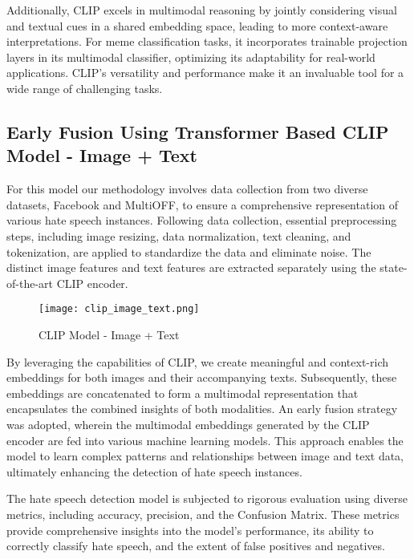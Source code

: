 \documentclass{ieeeaccess}
\begin{document}
Additionally, CLIP excels in multimodal reasoning by jointly considering visual and textual cues in a shared embedding space, leading to more context-aware interpretations. For meme classification tasks, it incorporates trainable projection layers in its multimodal classifier, optimizing its adaptability for real-world applications. CLIP's versatility and performance make it an invaluable tool for a wide range of challenging tasks.

\subsection{Early Fusion Using Transformer Based CLIP Model - Image + Text}

For this model our methodology involves data collection from two diverse datasets, Facebook and MultiOFF, to ensure a comprehensive representation of various hate speech instances. Following data collection, essential preprocessing steps, including image resizing, data normalization, text cleaning, and tokenization, are applied to standardize the data and eliminate noise. The distinct image features and text features are extracted separately using the state-of-the-art CLIP encoder.

\begin{figure}[htbp]
\centering
\texttt{[image: clip\_image\_text.png]}
\caption{CLIP Model - Image + Text}
\label{fig:clip_image_text}
\end{figure}

By leveraging the capabilities of CLIP, we create meaningful and context-rich embeddings for both images and their accompanying texts. Subsequently, these embeddings are concatenated to form a multimodal representation that encapsulates the combined insights of both modalities. An early fusion strategy was adopted, wherein the multimodal embeddings generated by the CLIP encoder are fed into various machine learning models. This approach enables the model to learn complex patterns and relationships between image and text data, ultimately enhancing the detection of hate speech instances.

The hate speech detection model is subjected to rigorous evaluation using diverse metrics, including accuracy, precision, and the Confusion Matrix. These metrics provide comprehensive insights into the model's performance, its ability to correctly classify hate speech, and the extent of false positives and negatives.
\end{document}
